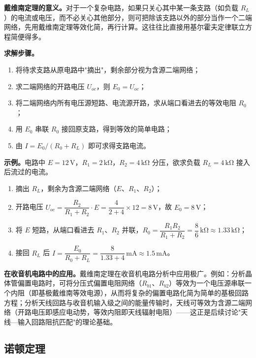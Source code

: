 \documentclass[12pt,UTF8]{ctexbook}
\begin{document}

\textbf{戴维南定理的意义。}对于一个复杂电路，如果只关心其中某一条支路（如负载 $R_L$）的电流或电压，而不必关心其他部分，则可把除该支路以外的部分当作一个二端网络，先用戴维南定理等效化简，再行计算。这往往比直接用基尔霍夫定律联立方程简便得多。

\textbf{求解步骤。}
\begin{enumerate}
  \item 将待求支路从原电路中"摘出"，剩余部分视为含源二端网络；
  \item 求二端网络的开路电压 $U_{oc}$，则 $E_0 = U_{oc}$；
  \item 将二端网络内所有电压源短路、电流源开路，求从端口看进去的等效电阻 $R_0$；
  \item 用 $E_0$ 串联 $R_0$ 接回原支路，得到等效的简单电路；
  \item 由 $I = E_0 / (R_0 + R_L)$ 即可求得支路电流。
\end{enumerate}

\textbf{示例。}电路中 $E=12\,\mathrm{V}$，$R_1=2\,\mathrm{k\Omega}$，$R_2=4\,\mathrm{k\Omega}$ 分压，欲求负载 $R_L=4\,\mathrm{k\Omega}$ 接入后流过的电流。

\begin{enumerate}
  \item 摘出 $R_L$，剩余为含源二端网络（$E$、$R_1$、$R_2$）；
  \item 开路电压 $U_{oc} = \dfrac{R_2}{R_1+R_2} \cdot E = \dfrac{4}{2+4} \times 12 = 8\,\mathrm{V}$，故 $E_0 = 8\,\mathrm{V}$；
  \item 将 $E$ 短路，从端口看进去 $R_1$、$R_2$ 并联，$R_0 = \dfrac{R_1 R_2}{R_1 + R_2} = \dfrac{8}{6}\,\mathrm{k\Omega} \approx 1.33\,\mathrm{k\Omega}$；
  \item 接回 $R_L$ 后 $I = \dfrac{E_0}{R_0 + R_L} = \dfrac{8}{1.33 + 4}\,\mathrm{mA} \approx 1.5\,\mathrm{mA}$。
\end{enumerate}

\textbf{在收音机电路中的应用。}戴维南定理在收音机电路分析中应用极广。例如：分析晶体管偏置电路时，可将分压式偏置电阻网络（$R_{b1}$、$R_{b2}$）等效为一个电压源串联一个内阻（即基极戴维南等效电源），从而将复杂的偏置电路化简为简单的基极回路方程；分析天线回路与收音机输入级之间的能量传输时，天线可等效为含源二端网络（开路电压即感应电动势，等效内阻即天线辐射电阻）——这正是后续讨论"天线—输入回路阻抗匹配"的理论基础。

\subsection{诺顿定理}
\end{document}
